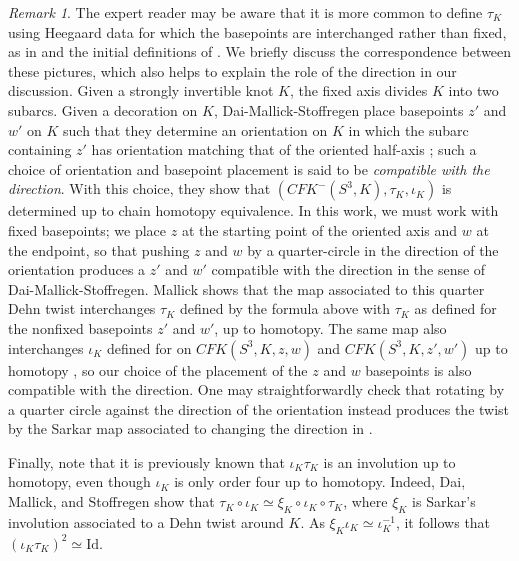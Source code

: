 \documentclass[11pt,reqno]{amsart}
\theoremstyle{definition}
\theoremstyle{remark}
\newtheorem{rem}[thm]{Remark}
\newcommand{\CFK}{\mathit{CFK}}
\numberwithin{equation}{section}
\begin{document}
\begin{rem} The expert reader may be aware that it is more common to define $\tau_K$ using Heegaard data for which the basepoints are interchanged rather than fixed, as in \cite{DMS:equivariant} and the initial definitions of \cite{Mallick:surgery}. We briefly discuss the correspondence between these pictures, which also helps to explain the role of the direction in our discussion. Given a strongly invertible knot $K$, the fixed axis divides $K$ into two subarcs. Given a decoration on $K$, Dai-Mallick-Stoffregen place basepoints $z'$ and $w'$ on $K$ such that they determine an orientation on $K$ in which the subarc containing $z'$ has orientation matching that of the oriented half-axis \cite[Figure 9]{DMS:equivariant}; such a choice of orientation and basepoint placement is said to be \emph{compatible with the direction}. With this choice, they show that $(\CFK^-(S^3,K), \tau_K, \iota_K)$ is determined up to chain homotopy equivalence. In this work, we must work with fixed basepoints; we place $z$ at the starting point of the oriented axis and $w$ at the endpoint, so that pushing $z$ and $w$ by a quarter-circle in the direction of the orientation produces a $z'$ and $w'$ compatible with the direction in the sense of Dai-Mallick-Stoffregen. Mallick \cite[Proposition 6.2]{Mallick:surgery} shows that the map associated to this quarter Dehn twist interchanges $\tau_K$ defined by the formula above with $\tau_K$ as defined for the nonfixed basepoints $z'$ and $w'$, up to homotopy. The same map also interchanges $\iota_K$ defined for on $\CFK(S^3,K,z,w)$ and $\CFK(S^3,K,z',w')$  up to homotopy \cite[Proposition 2.8 and Proposition 6.3]{HMInvolutive}, so our choice of the placement of the $z$ and $w$ basepoints is also compatible with the direction. One may straightforwardly check that rotating by a quarter circle against the direction of the orientation instead produces the twist by the Sarkar map associated to changing the direction in \cite[Section 3.5]{DMS:equivariant}.

Finally, note that it is previously known that $\iota_K \tau_K$ is an involution up to homotopy, even though $\iota_K$ is only order four up to homotopy. Indeed, Dai, Mallick, and Stoffregen \cite[Theorem 1.7]{DMS:equivariant} show that $\tau_K \circ \iota_K \simeq \xi_K \circ \iota_K \circ \tau_K$, where $\xi_K$ is Sarkar's involution associated to a Dehn twist around $K$. As $\xi_K \iota_K \simeq \iota_K^{-1}$, it follows that $(\iota_K \tau_K)^2 \simeq \mathrm{Id}$. 
\end{rem}
\end{document}
